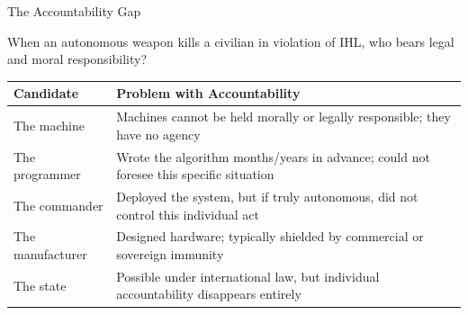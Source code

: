 \documentclass[aspectratio=169,11pt]{beamer}
\begin{document}
\begin{frame}[shrink=1]{The Accountability Gap}
\begin{argumentbox}
\small
When an autonomous weapon kills a civilian in violation of IHL, who bears legal and moral responsibility?
\vspace{0.1cm}

\scriptsize
\begin{tabular}{@{}p{2.8cm}p{9.1cm}@{}}
\toprule
\textbf{Candidate} & \textbf{Problem with Accountability} \\
\midrule
The machine & Machines cannot be held morally or legally responsible; they have no agency \\
The programmer & Wrote the algorithm months/years in advance; could not foresee this specific situation \\
The commander & Deployed the system, but if truly autonomous, did not control this individual act \\
The manufacturer & Designed hardware; typically shielded by commercial or sovereign immunity \\
The state & Possible under international law, but individual accountability disappears entirely \\
\bottomrule
\end{tabular}
\end{argumentbox}

\parencite{hrw_losing_humanity_2012}
\end{frame}
\end{document}
